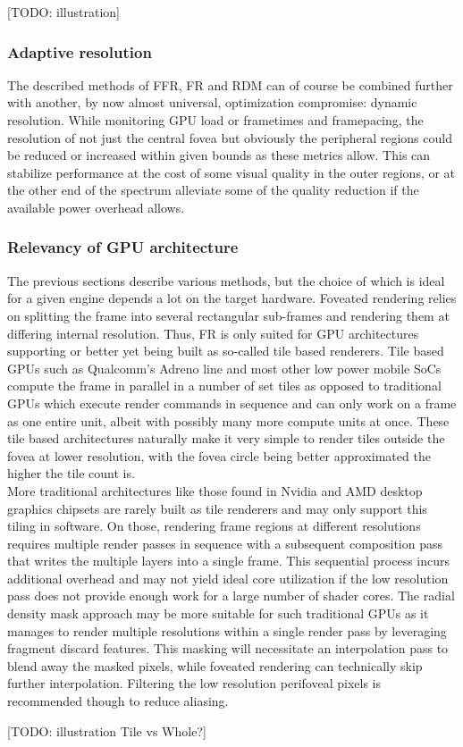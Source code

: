 [TODO: illustration]

\subsubsection{Adaptive resolution}
The described methods of FFR, FR and RDM can of course be combined further with another, by now almost universal, optimization compromise: dynamic resolution. While monitoring GPU load or frametimes and framepacing, the resolution of not just the central fovea but obviously the peripheral regions could be reduced or increased within given bounds as these metrics allow. This can stabilize performance at the cost of some visual quality in the outer regions, or at the other end of the spectrum alleviate some of the quality reduction if the available power overhead allows. 

\subsubsection{Relevancy of GPU architecture}
The previous sections describe various methods, but the choice of which is ideal for a given engine depends a lot on the target hardware. Foveated rendering relies on splitting the frame into several rectangular sub-frames and rendering them at differing internal resolution. Thus, FR is only suited for GPU architectures supporting or better yet being built as so-called tile based renderers. Tile based GPUs such as Qualcomm's Adreno line and most other low power mobile SoCs compute the frame in parallel in a number of set tiles as opposed to traditional GPUs which execute render commands in sequence and can only work on a frame as one entire unit, albeit with possibly many more compute units at once. These tile based architectures naturally make it very simple to render tiles outside the fovea at lower resolution, with the fovea circle being better approximated the higher the tile count is. \\
More traditional architectures like those found in Nvidia and AMD desktop graphics chipsets are rarely built as tile renderers and may only support this tiling in software. On those, rendering frame regions at different resolutions requires multiple render passes in sequence with a subsequent composition pass that writes the multiple layers into a single frame. This sequential process incurs additional overhead and may not yield ideal core utilization if the low resolution pass does not provide enough work for a large number of shader cores. The radial density mask approach may be more suitable for such traditional GPUs as it manages to render multiple resolutions within a single render pass by leveraging fragment discard features. This masking will necessitate an interpolation pass to blend away the masked pixels, while foveated rendering can technically skip further interpolation. Filtering the low resolution perifoveal pixels is recommended though to reduce aliasing. 

[TODO: illustration Tile vs Whole?]